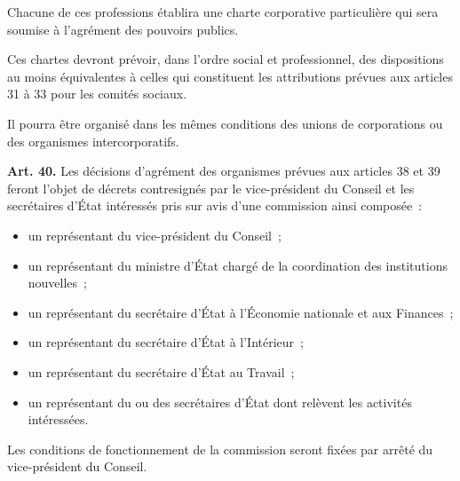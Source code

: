 \documentclass[french,twoside]{book} %
\newcommand{\labelchar}[1]{\textbf{\color{rubric} #1}}
\begin{document}
Chacune de ces professions établira une charte corporative particulière qui sera soumise à l’agrément des pouvoirs publics.\par
Ces chartes devront prévoir, dans l’ordre social et professionnel, des dispositions au moins équivalentes à celles qui constituent les attributions prévues aux articles 31 à 33 pour les comités sociaux.\par
Il pourra être organisé dans les mêmes conditions des unions de corporations ou des organismes intercorporatifs.\par
\bigbreak
\noindent \labelchar{Art. 40.} Les décisions d’agrément des organismes prévues aux articles 38 et 39 feront l’objet de décrets contresignés par le vice-président du Conseil et les secrétaires d’État intéressés pris sur avis d’une commission ainsi composée :\par

\begin{itemize}[itemsep=0pt,]
\item un représentant du vice-président du Conseil ;
\item un représentant du ministre d’État chargé de la coordination des institutions nouvelles ;
\item un représentant du secrétaire d’État à l’Économie nationale et aux Finances ;
\item un représentant du secrétaire d’État à l’Intérieur ;
\item un représentant du secrétaire d’État au Travail ;
\item un représentant du ou des secrétaires d’État dont relèvent les activités intéressées.
\end{itemize}
\noindent Les conditions de fonctionnement de la commission seront fixées par arrêté du vice-président du Conseil.
\end{document}
